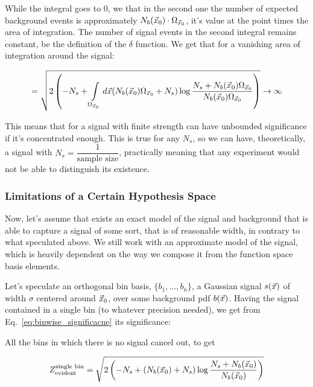 \documentclass[thesis/Elad_Kliger_Thesis.tex]{subfiles}
\begin{document}
While the integral goes to 0, we that in the second one the number of expected background events is approximately $N_b(\vec{{x}}_0) \cdot \Omega_{\vec{{x}}_0}$, it's value at the point times the area of integration. The number of signal events in the second integral remains constant, be the definition of the $\delta$ function. We get that for a vanishing area of integration around the signal:

\begin{equation}
    = \sqrt  {
        2 \left(
            -N_s 
            + \int\limits_{\Omega_{\vec{{x}}_0}} d\vec{{x}} (N_b(\vec{{x}}_0)\Omega_{\vec{{x}}_0} + N_s) \log \dfrac{N_s + N_b(\vec{{x}}_0)\Omega_{\vec{{x}}_0}}{N_b(\vec{{x}}_0)\Omega_{\vec{{x}}_0}}
        \right)
    } \to \infty
\end{equation}

This means that for a signal with finite strength can have unbounded significance if it's concentrated enough. This is true for any $N_s$, so we can have, theoretically, a signal with $N_s = \dfrac{1}{\text{sample size}}$, practically meaning that any experiment would not be able to distinguish its existence.

\subsubsection{Limitations of a Certain Hypothesis Space}

Now, let's assume that exists an exact model of the signal and background that is able to capture a signal of some sort, that is of reasonable width, in contrary to what speculated above. We still work with an approximate model of the signal, which is heavily dependent on the way we compose it from the function space basis elements.

Let's speculate an orthogonal bin basis, $\{b_1, \dots, b_n\}$, a Gaussian signal $s(\vec{{x}})$ of width $\sigma$ centered around $\vec{{x}}_0$, over some background \gls{pdf} $b(\vec{{x}})$. Having the signal contained in a single bin (to whatever precision needed), we get from Eq.~\ref{eq:binwise_significacne} its significance:

All the bins in which there is no signal cancel out, to get

\begin{equation}
    Z_\text{evident}^\text{single bin} = \sqrt{
        2 \left(
            -N_s
            + (N_b(\vec{{x}}_0) + N_s) \log \dfrac{N_s + N_b(\vec{{x}}_0)}{N_b(\vec{{x}}_0)}
        \right)
    }
\end{equation}
\end{document}
